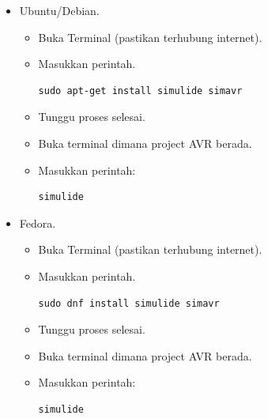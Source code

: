 \documentclass[12pt,]{article}
\begin{document}
\begin{itemize}
\begin{itemize}
		\end{itemize}

		\item Ubuntu/Debian.
		\begin{itemize}
			\item Buka Terminal (pastikan terhubung internet).
			\item Masukkan perintah.
			\begin{verbatim}
sudo apt-get install simulide simavr
			\end{verbatim}
			\item Tunggu proses selesai.
			\item Buka terminal dimana project AVR berada.
			\item Masukkan perintah:
			\begin{verbatim}
simulide
			\end{verbatim}
		\end{itemize}

		\item Fedora.
		\begin{itemize}
			\item Buka Terminal (pastikan terhubung internet).
			\item Masukkan perintah.
			\begin{verbatim}
sudo dnf install simulide simavr
			\end{verbatim}
			\item Tunggu proses selesai.
			\item Buka terminal dimana project AVR berada.
			\item Masukkan perintah:
			\begin{verbatim}
simulide
			\end{verbatim}
		\end{itemize}


\end{itemize}
\end{document}
